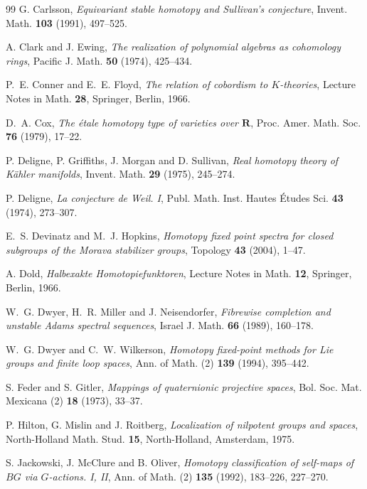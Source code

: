 \documentclass[11pt]{amsart}
\theoremstyle{plain}
\theoremstyle{definition}
\numberwithin{equation}{section}
\begin{document}
\begin{thebibliography}{99}
G. Carlsson, \emph{Equivariant stable homotopy and Sullivan's conjecture}, Invent. Math. \textbf{103} (1991), 497--525.

A. Clark and J. Ewing, \emph{The realization of polynomial algebras as cohomology rings}, Pacific J. Math. \textbf{50} (1974), 425--434.

P.~E. Conner and E.~E. Floyd, \emph{The relation of cobordism to $K$-theories}, Lecture Notes in Math. \textbf{28}, Springer, Berlin, 1966.

D.~A. Cox, \emph{The \'etale homotopy type of varieties over $\mathbf R$}, Proc. Amer. Math. Soc. \textbf{76} (1979), 17--22.

P. Deligne, P. Griffiths, J. Morgan and D. Sullivan, \emph{Real homotopy theory of K\"ahler manifolds}, Invent. Math. \textbf{29} (1975), 245--274.

P. Deligne, \emph{La conjecture de Weil. I}, Publ. Math. Inst. Hautes \'Etudes Sci. \textbf{43} (1974), 273--307.

E.~S. Devinatz and M.~J. Hopkins, \emph{Homotopy fixed point spectra for closed subgroups of the Morava stabilizer groups}, Topology \textbf{43} (2004), 1--47.

A. Dold, \emph{Halbexakte Homotopiefunktoren}, Lecture Notes in Math. \textbf{12}, Springer, Berlin, 1966.

W.~G. Dwyer, H.~R. Miller and J. Neisendorfer, \emph{Fibrewise completion and unstable Adams spectral sequences}, Israel J. Math. \textbf{66} (1989), 160--178.

W.~G. Dwyer and C.~W. Wilkerson, \emph{Homotopy fixed-point methods for Lie groups and finite loop spaces}, Ann. of Math. (2) \textbf{139} (1994), 395--442.

S. Feder and S. Gitler, \emph{Mappings of quaternionic projective spaces}, Bol. Soc. Mat. Mexicana (2) \textbf{18} (1973), 33--37.

P. Hilton, G. Mislin and J. Roitberg, \emph{Localization of nilpotent groups and spaces}, North-Holland Math. Stud. \textbf{15}, North-Holland, Amsterdam, 1975.

S. Jackowski, J. McClure and B. Oliver, \emph{Homotopy classification of self-maps of $BG$ via $G$-actions. I, II}, Ann. of Math. (2) \textbf{135} (1992), 183--226, 227--270.


\end{thebibliography}
\end{document}
